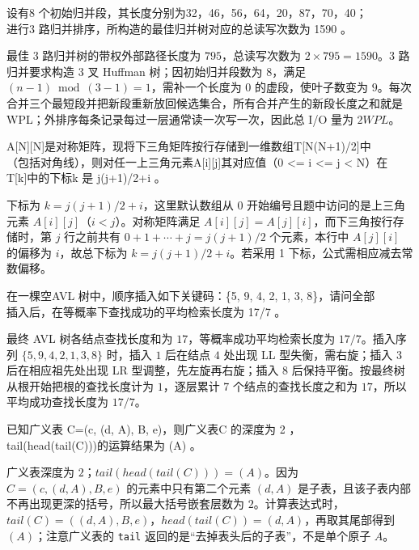 \begin{question}
设有8 个初始归并段，其长度分别为32，46，56，64，20，87，70，40；\\
进行3 路归并排序，所构造的最佳归并树对应的总读写次数为 1590   。\\
\begin{solution}
最佳 3 路归并树的带权外部路径长度为 $795$，总读写次数为 $2\times795=1590$。3 路归并要求构造 3 叉 Huffman 树；因初始归并段数为 $8$，满足 $(n-1)\bmod(3-1)=1$，需补一个长度为 $0$ 的虚段，使叶子数变为 $9$。每次合并三个最短段并把新段重新放回候选集合，所有合并产生的新段长度之和就是 WPL；外排序每条记录每过一层通常读一次写一次，因此总 I/O 量为 $2WPL$。
\end{solution}
\end{question}

\begin{question}
A[N][N]是对称矩阵，现将下三角矩阵按行存储到一维数组T[N(N+1)/2]中\\
（包括对角线），则对任一上三角元素A[i][j]其对应值（0 <= i <= j < N）在\\
T[k]中的下标k 是     j(j+1)/2+i       。\\
\begin{solution}
下标为 $k=j(j+1)/2+i$，这里默认数组从 $0$ 开始编号且题中访问的是上三角元素 $A[i][j]$（$i<j$）。对称矩阵满足 $A[i][j]=A[j][i]$，而下三角按行存储时，第 $j$ 行之前共有 $0+1+\cdots+j=j(j+1)/2$ 个元素，本行中 $A[j][i]$ 的偏移为 $i$，故总下标为 $k=j(j+1)/2+i$。若采用 1 下标，公式需相应减去常数偏移。
\end{solution}
\end{question}

\begin{question}
在一棵空AVL 树中，顺序插入如下关键码：\{5, 9, 4, 2, 1, 3, 8\}，请问全部\\
插入后，在等概率下查找成功的平均检索长度为  17/7     。\\
\begin{solution}
最终 AVL 树各结点查找长度和为 $17$，等概率成功平均检索长度为 $17/7$。插入序列 $\{5,9,4,2,1,3,8\}$ 时，插入 $1$ 后在结点 $4$ 处出现 LL 型失衡，需右旋；插入 $3$ 后在相应祖先处出现 LR 型调整，先左旋再右旋；插入 $8$ 后保持平衡。按最终树从根开始把根的查找长度计为 $1$，逐层累计 7 个结点的查找长度之和为 $17$，所以平均成功查找长度为 $17/7$。
\end{solution}
\end{question}

\begin{question}
已知广义表 C=(c, (d, A), B, e)，则广义表C 的深度为   2     ，\\
tail(head(tail(C)))的运算结果为  (A)     。\\
\begin{solution}
广义表深度为 $2$；$tail(head(tail(C)))=(A)$。因为 $C=(c,(d,A),B,e)$ 的元素中只有第二个元素 $(d,A)$ 是子表，且该子表内部不再出现更深的括号，所以最大括号嵌套层数为 $2$。计算表达式时，$tail(C)=((d,A),B,e)$，$head(tail(C))=(d,A)$，再取其尾部得到 $(A)$；注意广义表的 \texttt{tail} 返回的是“去掉表头后的子表”，不是单个原子 $A$。
\end{solution}
\end{question}


